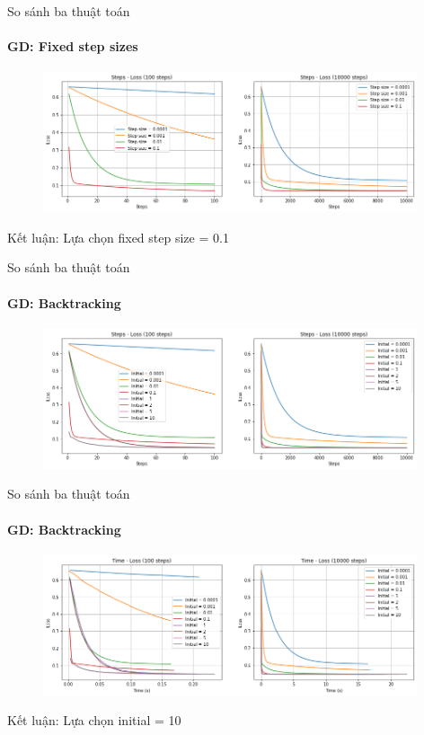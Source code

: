 \documentclass[10pt]{beamer}
\theoremstyle{remark}
\theoremstyle{definition}
\begin{document}
\begin{frame}{So sánh ba thuật toán}
	\framesubtitle{GD: Fixed step sizes}

	  \begin{figure}[h!]
		\centering
		\includegraphics[width=11cm]{Thinh/4.png}
	  \end{figure}
	  Kết luận: Lựa chọn fixed step size = 0.1
\end{frame}

\begin{frame}{So sánh ba thuật toán}
	\framesubtitle{GD: Backtracking}
	\begin{figure}[h!]
		\centering
		\includegraphics[width=11cm]{Thinh/5.png}
	\end{figure}

\end{frame}

\begin{frame}{So sánh ba thuật toán}
	\framesubtitle{GD: Backtracking}
	\begin{figure}[h!]
		\centering
		\includegraphics[width=11cm]{Thinh/6.png}
	\end{figure}
	Kết luận: Lựa chọn initial = 10
\end{frame}
\end{document}
